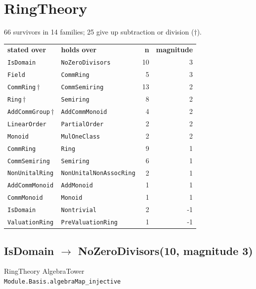 \documentclass[10pt,a4paper]{article}
\begin{document}
\clearpage
\section{RingTheory}
66 survivors in 14 families; 25 give up subtraction or division ($\dagger$).

\begin{center}
\begin{tabular}{llrr}
\textbf{stated over} & \textbf{holds over} & \textbf{n} & \textbf{magnitude}\\[2pt]
\texttt{\small IsDomain} & \texttt{\small NoZeroDivisors} & 10 & 3\\
\texttt{\small Field} & \texttt{\small CommRing} & 5 & 3\\
\texttt{\small CommRing}\,$\dagger$ & \texttt{\small CommSemiring} & 13 & 2\\
\texttt{\small Ring}\,$\dagger$ & \texttt{\small Semiring} & 8 & 2\\
\texttt{\small AddCommGroup}\,$\dagger$ & \texttt{\small AddCommMonoid} & 4 & 2\\
\texttt{\small LinearOrder} & \texttt{\small PartialOrder} & 2 & 2\\
\texttt{\small Monoid} & \texttt{\small MulOneClass} & 2 & 2\\
\texttt{\small CommRing} & \texttt{\small Ring} & 9 & 1\\
\texttt{\small CommSemiring} & \texttt{\small Semiring} & 6 & 1\\
\texttt{\small NonUnitalRing} & \texttt{\small NonUnitalNonAssocRing} & 2 & 1\\
\texttt{\small AddCommMonoid} & \texttt{\small AddMonoid} & 1 & 1\\
\texttt{\small CommMonoid} & \texttt{\small Monoid} & 1 & 1\\
\texttt{\small IsDomain} & \texttt{\small Nontrivial} & 2 & -1\\
\texttt{\small ValuationRing} & \texttt{\small PreValuationRing} & 1 & -1\\
\end{tabular}
\end{center}

\subsection*{IsDomain $\to$ NoZeroDivisors\quad\textmd{\small (10, magnitude 3)}}
{\footnotesize\color{locator}RingTheory\,\textperiodcentered\,AlgebraTower}\\
\hspace*{1em}\texttt{\small Module.\allowbreak{}Basis.\allowbreak{}algebraMap\_injective}\\
\end{document}
